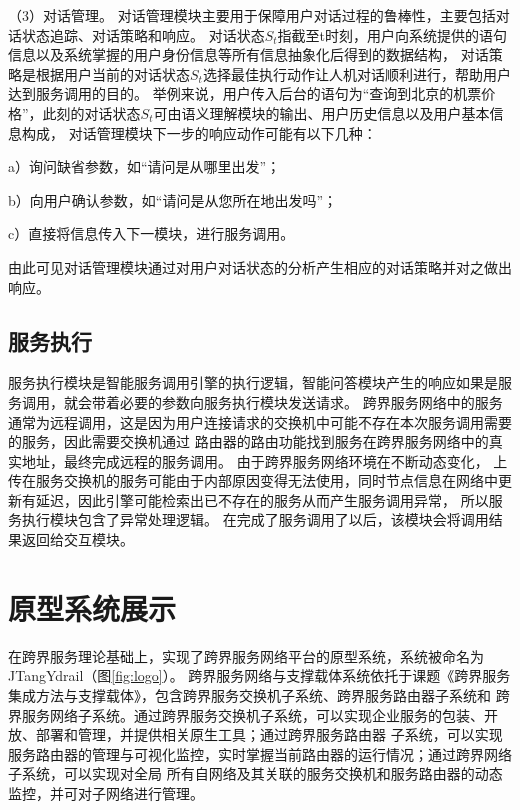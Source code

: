 （3）对话管理。
对话管理模块主要用于保障用户对话过程的鲁棒性，主要包括对话状态追踪、对话策略和响应。
对话状态$S_{t}$指截至t时刻，用户向系统提供的语句信息以及系统掌握的用户身份信息等所有信息抽象化后得到的数据结构，
对话策略是根据用户当前的对话状态$S_{t}$选择最佳执行动作让人机对话顺利进行，帮助用户达到服务调用的目的。
举例来说，用户传入后台的语句为“查询到北京的机票价格”，此刻的对话状态$S_{t}$可由语义理解模块的输出、用户历史信息以及用户基本信息构成，
对话管理模块下一步的响应动作可能有以下几种：

a）询问缺省参数，如“请问是从哪里出发”；

b）向用户确认参数，如“请问是从您所在地出发吗”；

c）直接将信息传入下一模块，进行服务调用。

由此可见对话管理模块通过对用户对话状态的分析产生相应的对话策略并对之做出响应。

\subsection{服务执行}
服务执行模块是智能服务调用引擎的执行逻辑，智能问答模块产生的响应如果是服务调用，就会带着必要的参数向服务执行模块发送请求。
跨界服务网络中的服务通常为远程调用，这是因为用户连接请求的交换机中可能不存在本次服务调用需要的服务，因此需要交换机通过
路由器的路由功能找到服务在跨界服务网络中的真实地址，最终完成远程的服务调用。
由于跨界服务网络环境在不断动态变化，
上传在服务交换机的服务可能由于内部原因变得无法使用，同时节点信息在网络中更新有延迟，因此引擎可能检索出已不存在的服务从而产生服务调用异常，
所以服务执行模块包含了异常处理逻辑。
在完成了服务调用了以后，该模块会将调用结果返回给交互模块。


\section{原型系统展示}
在跨界服务理论基础上，实现了跨界服务网络平台的原型系统，系统被命名为JTangYdrail（图\ref{fig:logo}）。
跨界服务网络与支撑载体系统依托于课题《跨界服务集成方法与支撑载体》，包含跨界服务交换机子系统、跨界服务路由器子系统和
跨界服务网络子系统。通过跨界服务交换机子系统，可以实现企业服务的包装、开放、部署和管理，并提供相关原生工具；通过跨界服务路由器
子系统，可以实现服务路由器的管理与可视化监控，实时掌握当前路由器的运行情况；通过跨界网络子系统，可以实现对全局
所有自网络及其关联的服务交换机和服务路由器的动态监控，并可对子网络进行管理。

